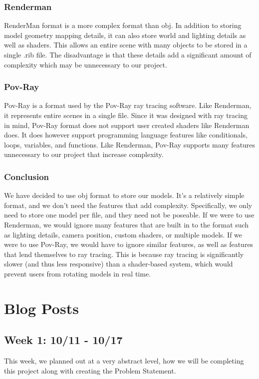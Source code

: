 \documentclass[letterpaper,10pt, onecolumn, draftclsnofoot]{IEEEtran}
\begin{document}
\subsubsection{Renderman}
RenderMan format is a more complex format than obj. In addition to storing model geometry mapping details, it can also store world and lighting details as well as shaders. This allows an entire scene with many objects to be stored in a single .rib file. The disadvantage is that these details add a significant amount of complexity which may be unnecessary to our project.

\subsubsection{Pov-Ray}
Pov-Ray is a format used by the Pov-Ray ray tracing software. Like Renderman, it represents entire scenes in a single file. Since it was designed with ray tracing in mind, Pov-Ray format does not support user created shaders like Renderman does. It does however support programming language features like conditionals, loops, variables, and functions. Like Renderman, Pov-Ray supports many features unnecessary to our project that increase complexity.

\subsubsection{Conclusion}
We have decided to use obj format to store our models. It's a relatively simple format, and we don't need the features that add complexity. Specifically, we only need to store one model per file, and they need not be poseable. If we were to use Renderman, we would ignore many features that are built in to the format such as lighting details, camera position, custom shaders, or multiple models. If we were to use Pov-Ray, we would have to ignore similar features, as well as features that lend themselves to ray tracing. This is because ray tracing is significantly slower (and thus less responsive) than a shader-based system, which would prevent users from rotating models in real time.

\section{Blog Posts}
\subsection{Week 1: 10/11 - 10/17}
This week, we planned out at a very abstract level, how we will be completing this project along with creating the Problem Statement.
\end{document}
